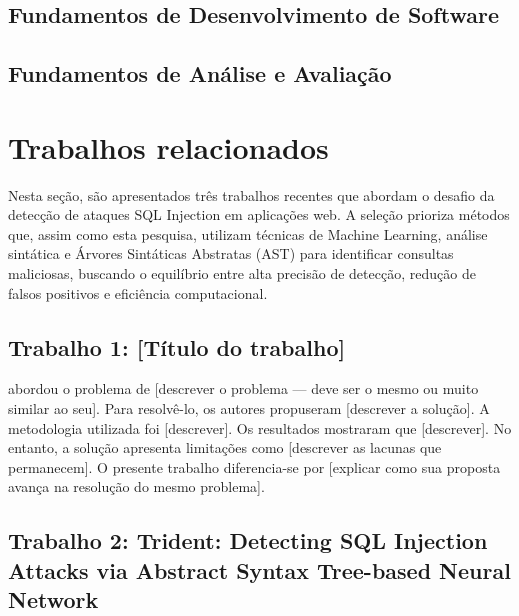 \documentclass[
    12pt,                %
    openright,           %
    oneside,             %
    a4paper,             %
    english,             %
    brazil               %
]{abntex2}
\begin{document}
\subsection{Fundamentos de Desenvolvimento de Software}

\subsection{Fundamentos de Análise e Avaliação}

\section{Trabalhos relacionados}
\label{sec:trabalhos_relacionados}

Nesta seção, são apresentados três trabalhos recentes que abordam o desafio da detecção de ataques SQL Injection em aplicações web. A seleção prioriza métodos que, assim como esta pesquisa, utilizam técnicas de Machine Learning, análise sintática e Árvores Sintáticas Abstratas (AST) para identificar consultas maliciosas, buscando o equilíbrio entre alta precisão de detecção, redução de falsos positivos e eficiência computacional.

\subsection{Trabalho 1: [Título do trabalho]}

 abordou o problema de [descrever o problema --- deve ser o mesmo ou muito similar ao seu]. Para resolvê-lo, os autores propuseram [descrever a solução]. A metodologia utilizada foi [descrever]. Os resultados mostraram que [descrever]. No entanto, a solução apresenta limitações como [descrever as lacunas que permanecem]. O presente trabalho diferencia-se por [explicar como sua proposta avança na resolução do mesmo problema].

\subsection{Trabalho 2: Trident: Detecting SQL Injection Attacks via Abstract Syntax Tree-based Neural Network}
\end{document}
